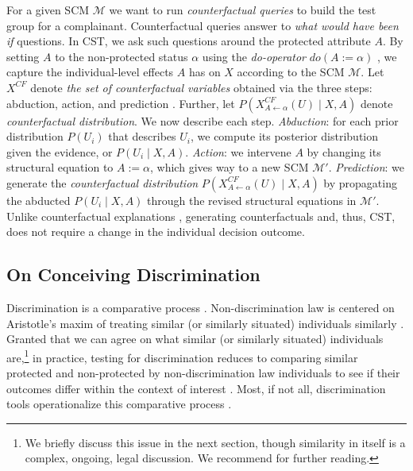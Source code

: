 For a given SCM $\mathcal{M}$ we want to run \textit{counterfactual queries} to build the test group for a complainant. Counterfactual queries answer to \textit{what would have been if} questions. 
In CST, we ask such questions around the protected attribute $A$. 
By setting $A$ to the non-protected status $\alpha$ using the \textit{do-operator} $do(A := \alpha)$ \parencite{PearlCausality2009}, we capture the individual-level effects $A$ has on $X$ according to the SCM $\mathcal{M}$. 
Let $X^{CF}$ denote \textit{the set of counterfactual variables} obtained via the three steps: abduction, action, and prediction \parencite{Pearl2016_CausalInference}. 
Further, 
let $P(X^{CF}_{A \leftarrow \alpha}(U) \; | \; X, A)$ denote \textit{counterfactual distribution}.
%
We now describe each step.
%
\textit{Abduction}: for each prior distribution $P(U_i)$ that describes $U_i$, we compute its posterior distribution given the evidence, or $P(U_i \;| \; X, A)$. \textit{Action}: we intervene $A$ by changing its structural equation to $A := \alpha$, which gives way to a new SCM $\mathcal{M}'$. \textit{Prediction}: we generate the \textit{counterfactual distribution} $P(X^{CF}_{A \leftarrow \alpha}(U) \; | \; X, A)$ by propagating the abducted $P(U_i \;| \; X, A)$ through the revised structural equations in $\mathcal{M}'$.
%
Unlike counterfactual explanations \parencite{Wachter2017Counterfactual}, generating counterfactuals and, thus, CST,  does not require a change in the individual decision outcome. 

\subsection{On Conceiving Discrimination}
\label{sec:CausalKnowledge.IndDisc}

Discrimination is a comparative process \parencite{Lippert2006BadnessOfDiscrimination}. 
Non-discrimination law is centered on Aristotle's maxim of treating similar (or similarly situated) individuals similarly \parencite{Westen1982EmptyEquality}.
Granted that we can agree on what similar (or similarly situated) individuals are,\footnote{We briefly discuss this issue in the next section, though similarity in itself is a complex, ongoing, legal discussion. We recommend \textcite{Westen1982EmptyEquality} for further reading.} in practice, testing for discrimination reduces to comparing similar protected and non-protected by non-discrimination law individuals to see if their outcomes differ within the context of interest \parencite{DBLP:conf/fat/WeertsXTOP23}.
Most, if not all, discrimination tools operationalize this comparative process \parencite{Kohler2018CausalEddie}.

